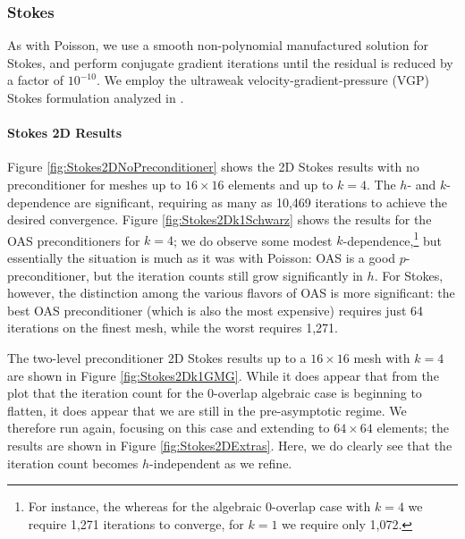 \newcommand{\StokesThreeDSchwarzAlgebraicStartkOne}{31} %
\newcommand{\StokesThreeDSchwarzGeometricStartkOne}{43}
\newcommand{\StokesThreeDGMGSchwarzAlgebraicStartkOne}{7} %
\newcommand{\StokesThreeDGMGSchwarzGeometricStartkOne}{19}

\subsubsection{Stokes}
As with Poisson, we use a smooth non-polynomial manufactured solution for Stokes, and perform conjugate gradient iterations until the residual is reduced by a factor of $10^{-10}$.  We employ the ultraweak velocity-gradient-pressure (VGP) Stokes formulation analyzed in \cite{DPGStokes}.

\paragraph{Stokes 2D Results}
Figure \ref{fig:Stokes2DNoPreconditioner} shows the 2D Stokes results with no preconditioner for meshes up to $16 \times 16$ elements and up to $k=4$.  The $h$- and $k$-dependence are significant, requiring as many as 10,469 iterations to achieve the desired convergence.  Figure \ref{fig:Stokes2Dk1Schwarz} shows the results for the OAS preconditioners for $k=4$; we do observe some modest $k$-dependence,\footnote{For instance, the whereas for the algebraic 0-overlap case with $k=4$ we require 1,271 iterations to converge, for $k=1$ we require only 1,072.} but essentially the situation is much as it was with Poisson: OAS is a good $p$-preconditioner, but the iteration counts still grow significantly in $h$.  For Stokes, however, the distinction among the various flavors of OAS is more significant: the best OAS preconditioner (which is also the most expensive) requires just 64 iterations on the finest mesh, while the worst requires 1,271.

The two-level preconditioner 2D Stokes results up to a $16 \times 16$ mesh with $k=4$ are shown in Figure \ref{fig:Stokes2Dk1GMG}.  While it does appear that from the plot that the iteration count for the 0-overlap algebraic case is beginning to flatten, it does appear that we are still in the pre-asymptotic regime.  We therefore run again, focusing on this case and extending to $64 \times 64$ elements; the results are shown in Figure \ref{fig:Stokes2DExtras}.  Here, we do clearly see that the iteration count becomes $h$-independent as we refine. 

